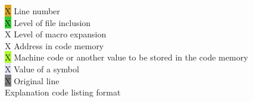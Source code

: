 \begin{code}[h]
                        \colorbox{Goldenrod}{\color{Goldenrod}X} Line number \\
                        \colorbox{LimeGreen}{\color{LimeGreen}X} Level of file inclusion \\
                        \colorbox{ProcessBlue}{\color{ProcessBlue}X} Level of macro expansion \\
                        \colorbox{Apricot}{\color{Apricot}X} Address in code memory \\
                        \colorbox{GreenYellow}{\color{GreenYellow}X} Machine code or another value to be stored in the code memory \\
                        \colorbox{Lavender}{\color{Lavender}X} Value of a symbol \\
                        \colorbox{Gray}{\color{Gray}X} Original line \\

                        \caption{Explanation code listing format}
                \end{code}

